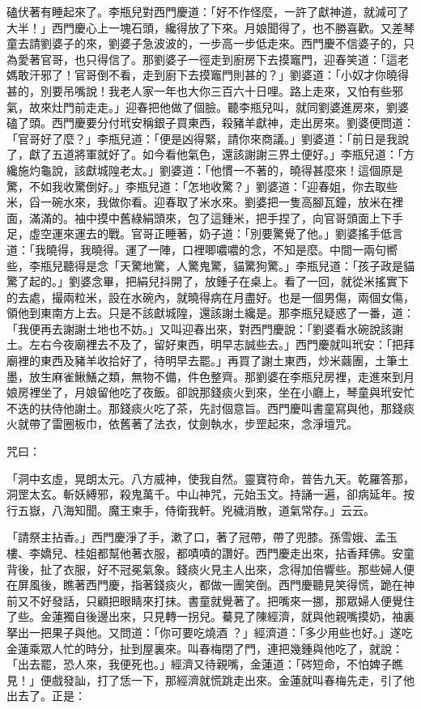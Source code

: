 磕伏著有睡起來了。李瓶兒對西門慶道：「好不作怪麼，一許了獻神道，就減可了大半！」西門慶心上一塊石頭，纔得放了下來。月娘聞得了，也不勝喜歡。又差琴童去請劉婆子的來，劉婆子急波波的，一步高一步低走來。西門慶不信婆子的，只為愛著官哥，也只得信了。那劉婆子一徑走到廚房下去摸竈門，迎春笑道：「這老媽敢汗邪了！官哥倒不看，走到廚下去摸竈門則甚的？」劉婆道：「小奴才你曉得甚的，別要吊嘴說！我老人家一年也大你三百六十日哩。路上走來，又怕有些邪氣，故來灶門前走走。」迎春把他做了個臉。聽李瓶兒叫，就同劉婆進房來，劉婆磕了頭。西門慶要分付玳安稱銀子買東西，殺豬羊獻神，走出房來。劉婆便問道：「官哥好了麼？」李瓶兒道：「便是凶得緊，請你來商議。」劉婆道：「前日是我說了，獻了五道將軍就好了。如今看他氣色，還該謝謝三界土便好。」李瓶兒道：「方纔施灼龜說，該獻城隍老太。」劉婆道：「他慣一不著的，曉得甚麼來！這個原是驚，不如我收驚倒好。」李瓶兒道：「怎地收驚？」劉婆道：「迎春姐，你去取些米，舀一碗水來，我做你看。迎春取了米水來。劉婆把一隻高腳瓦鐘，放米在裡面，滿滿的。袖中摸中舊綠絹頭來，包了這鍾米，把手捏了，向官哥頭面上下手足，虛空運來運去的戰。官哥正睡著，奶子道：「別要驚覺了他。」劉婆搖手低言道：「我曉得，我曉得。運了一陣，口裡唧噥噥的念，不知是麼。中間一兩句嚮些，李瓶兒聽得是念「天驚地驚，人驚鬼驚，貓驚狗驚。」李瓶兒道：「孩子政是貓驚了起的。」劉婆念畢，把絹兒抖開了，放鍾子在桌上。看了一回，就從米搖實下的去處，撮兩粒米，設在水碗內，就曉得病在月盡好。也是一個男傷，兩個女傷，領他到東南方上去。只是不該獻城隍，還該謝土纔是。那李瓶兒疑惑了一番，道：「我便再去謝謝土地也不妨。」又叫迎春出來，對西門慶說：「劉婆看水碗說該謝土。左右今夜廟裡去不及了，留好東西，明早志誠些去。」西門慶就叫玳安：「把拜廟裡的東西及豬羊收拾好了，待明早去罷。」再買了謝土東西，炒米繭團，土筆土墨，放生麻雀鰍鱔之類，無物不備，件色整齊。那劉婆在李瓶兒房裡，走進來到月娘房裡坐了，月娘留他吃了夜飯。卻說那錢痰火到來，坐在小廳上，琴童與玳安忙不迭的扶侍他謝土。那錢痰火吃了茶，先討個意旨。西門慶叫書童寫與他，那錢痰火就帶了雷圈板巾，依舊著了法衣，仗劍執水，步罡起來，念淨壇咒。

咒曰：

「洞中玄虛，晃朗太元。八方威神，使我自然。靈寶符命，普告九天。乾羅答那，洞罡太玄。斬妖縛邪，殺鬼萬千。中山神咒，元始玉文。持誦一遍，卻病延年。按行五嶽，八海知聞。魔王柬手，侍衛我軒。兇穢消散，道氣常存。」云云。

「請祭主拈香。」西門慶淨了手，漱了口，著了冠帶，帶了兜膝。孫雪娥、孟玉樓、李嬌兒、桂姐都幫他著衣服，都嘖嘖的讚好。西門慶走出來，拈香拜佛。安童背後，扯了衣服，好不冠冕氣象。錢痰火見主人出來，念得加倍響些。那些婦人便在屏風後，瞧著西門慶，指著錢痰火，都做一團笑倒。西門慶聽見笑得慌，跪在神前又不好發話，只顧把眼睛來打抹。書童就覺著了。把嘴來一挪，那眾婦人便覺住了些。金蓮獨自後邊出來，只見轉一拐兒。驀見了陳經濟，就與他親嘴摸奶，袖裏拏出一把果子與他。又問道：「你可要吃燒酒 ？」經濟道：「多少用些也好。」遂吃金蓮乘眾人忙的時分，扯到屋裏來。叫春梅閉了門，連把幾鍾與他吃了，就說：「出去罷，恐人來，我便死也。」經濟又待親嘴，金蓮道：「硶短命，不怕婢子瞧見！」便戲發訕，打了恁一下，那經濟就慌跳走出來。金蓮就叫春梅先走，引了他出去了。正是：

